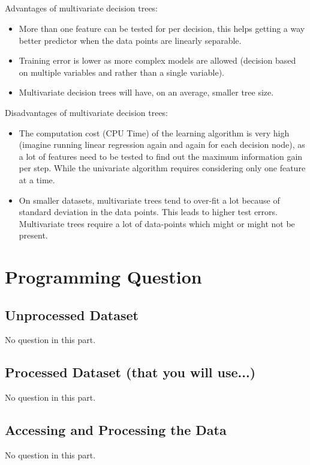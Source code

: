 \documentclass[letterpaper]{article}
\begin{document}
\subsection{}
Advantages of multivariate decision trees:
\begin{itemize}
\item	More than one feature can be tested for per decision, this helps getting a way better predictor when the data points are linearly separable.
\item	Training error is lower as more complex models are allowed (decision based on multiple variables and rather than a single variable).
\item	Multivariate decision trees will have, on an average, smaller tree size. 
\end{itemize}

Disadvantages of multivariate decision trees:
\begin{itemize}
\item	The computation cost (CPU Time) of the learning algorithm is very high (imagine running linear regression again and again for each decision node), as a lot of features need to be tested to find out the maximum information gain per step. While the univariate algorithm requires considering only one feature at a time.
\item	On smaller datasets, multivariate trees tend to over-fit a lot because of standard deviation in the data points. This leads to higher test errors. Multivariate trees require a lot of data-points which might or might not be present.
\end{itemize}

\section{Programming Question}

\subsection{Unprocessed Dataset}
No question in this part.

\subsection{Processed Dataset (that you will use...)}
No question in this part.

\subsection{Accessing and Processing the Data}
No question in this part.
\end{document}
